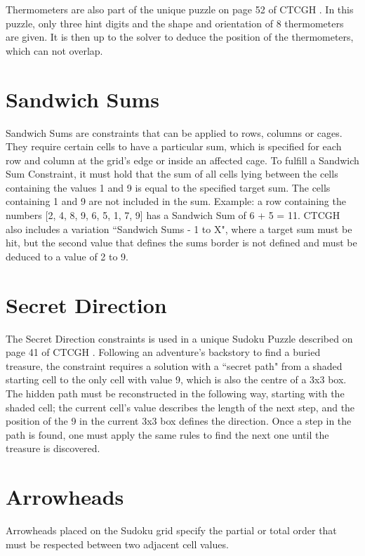 Thermometers are also part of the unique puzzle on page 52 of CTCGH \cite{CrackingTheCryptic2021}. In this puzzle, only three hint digits and the shape and orientation of 8 thermometers are given. It is then up to the solver to deduce the position of the thermometers, which can not overlap.

\section{Sandwich Sums}
Sandwich Sums are constraints that can be applied to rows, columns or cages. They require certain cells to have a particular sum, which is specified for each row and column at the grid's edge or inside an affected cage. To fulfill a Sandwich Sum Constraint, it must hold that the sum of all cells lying between the cells containing the values 1 and 9 is equal to the specified target sum. The cells containing 1 and 9 are not included in the sum. Example: a row containing the numbers [2, 4, 8, 9, 6, 5, 1, 7, 9] has a Sandwich Sum of 6 + 5 = 11. CTCGH \cite{CrackingTheCryptic2021} also includes a variation ``Sandwich Sums - 1 to X", where a target sum must be hit, but the second value that defines the sums border is not defined and must be deduced to a value of 2 to 9.

\section{Secret Direction}
The Secret Direction constraints is used in a unique Sudoku Puzzle described on page 41 of CTCGH \cite{CrackingTheCryptic2021}. Following an adventure's backstory to find a buried treasure, the constraint requires a solution with a ``secret path" from a shaded starting cell to the only cell with value 9, which is also the centre of a 3x3 box. The hidden path must be reconstructed in the following way, starting with the shaded cell; the current cell's value describes the length of the next step, and the position of the 9 in the current 3x3 box defines the direction. Once a step in the path is found, one must apply the same rules to find the next one until the treasure is discovered.

\section{Arrowheads}
Arrowheads placed on the Sudoku grid specify the partial or total order that must be respected between two adjacent cell values.

